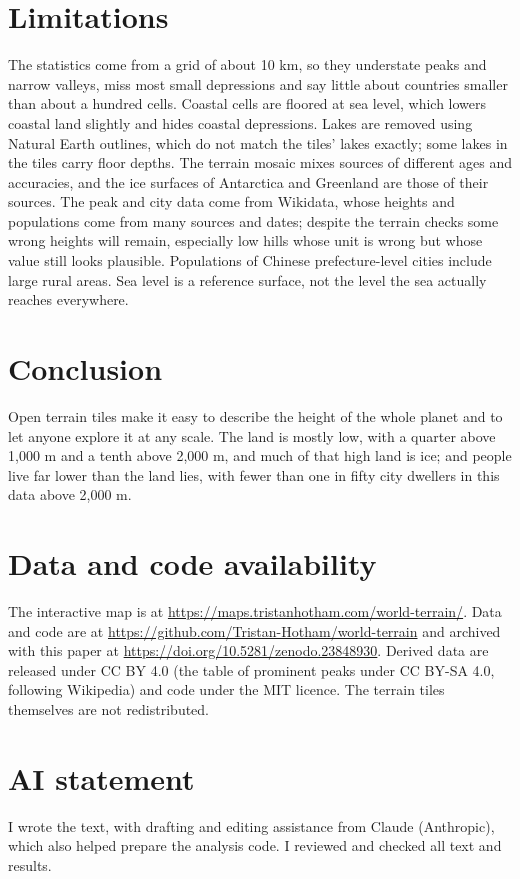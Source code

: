 \documentclass[11pt,a4paper]{article}
\begin{document}
\section{Limitations}
The statistics come from a grid of about 10 km, so they understate peaks and narrow valleys, miss most small depressions and say little about countries smaller than about a hundred cells. Coastal cells are floored at sea level, which lowers coastal land slightly and hides coastal depressions. Lakes are removed using Natural Earth outlines, which do not match the tiles' lakes exactly; some lakes in the tiles carry floor depths. The terrain mosaic mixes sources of different ages and accuracies, and the ice surfaces of Antarctica and Greenland are those of their sources. The peak and city data come from Wikidata, whose heights and populations come from many sources and dates; despite the terrain checks some wrong heights will remain, especially low hills whose unit is wrong but whose value still looks plausible. Populations of Chinese prefecture-level cities include large rural areas. Sea level is a reference surface, not the level the sea actually reaches everywhere.

\section{Conclusion}
Open terrain tiles make it easy to describe the height of the whole planet and to let anyone explore it at any scale. The land is mostly low, with a quarter above 1,000 m and a tenth above 2,000 m, and much of that high land is ice; and people live far lower than the land lies, with fewer than one in fifty city dwellers in this data above 2,000 m.

\section*{Data and code availability}
The interactive map is at \url{https://maps.tristanhotham.com/world-terrain/}. Data and code are at \url{https://github.com/Tristan-Hotham/world-terrain} and archived with this paper at \url{https://doi.org/10.5281/zenodo.23848930}. Derived data are released under CC BY 4.0 (the table of prominent peaks under CC BY-SA 4.0, following Wikipedia) and code under the MIT licence. The terrain tiles themselves are not redistributed.

\section*{AI statement}
I wrote the text, with drafting and editing assistance from Claude (Anthropic), which also helped prepare the analysis code. I reviewed and checked all text and results.
\end{document}
